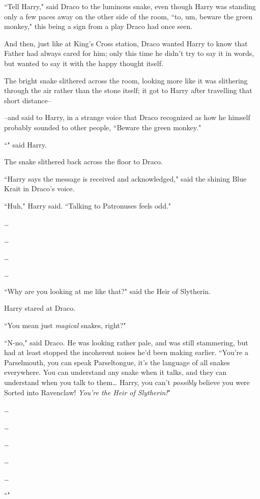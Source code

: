 ``Tell Harry," said Draco to the luminous snake, even though Harry was standing only a few paces away on the other side of the room, ``to, um, beware the green monkey," this being a sign from a play Draco had once seen.

And then, just like at King's Cross station, Draco wanted Harry to know that Father had always cared for him; only this time he didn't try to say it in words, but wanted to say it with the happy thought itself.

The bright snake slithered across the room, looking more like it was slithering through the air rather than the stone itself; it got to Harry after travelling that short distance\---

\---and said to Harry, in a strange voice that Draco recognized as how he himself probably sounded to other people, ``Beware the green monkey."

``" said Harry.

The snake slithered back across the floor to Draco.

``Harry says the message is received and acknowledged," said the shining Blue Krait in Draco's voice.

``Huh," Harry said. ``Talking to Patronuses feels odd."

{\ldots}

{\ldots}

{\ldots}

{\ldots}

``Why are you looking at me like that?" said the Heir of Slytherin.


Harry stared at Draco.

``You mean just \emph{magical} snakes, right?"

``N-no," said Draco. He was looking rather pale, and was still stammering, but had at least stopped the incoherent noises he'd been making earlier. ``You're a Parselmouth, you can speak Parseltongue, it's the language of all snakes everywhere. You can understand any snake when it talks, and they can understand when you talk to them{\ldots} Harry, you can't \emph{possibly} believe you were Sorted into Ravenclaw! \emph{You're the Heir of Slytherin!}"

{\ldots}

{\ldots}

{\ldots}

{\ldots}

{\ldots}

``"

